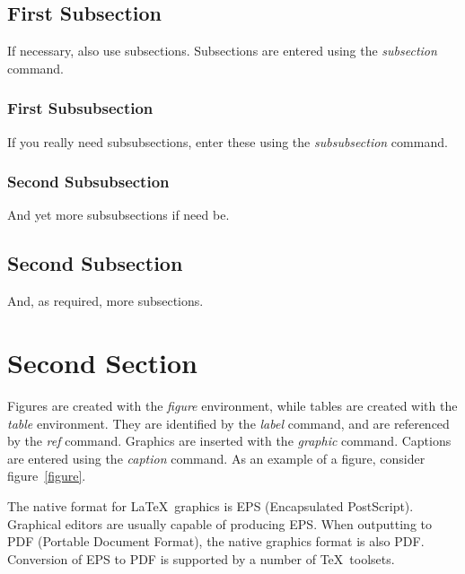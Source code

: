 \documentclass[a4paper,11pt]{report}
\begin{document}
\subsection{First Subsection}

\label{technical-subsection1}

If necessary, also use subsections. Subsections are entered using the
\textit{{\bs}subsection} command.

\subsubsection{First Subsubsection}

\label{technical-subsubsection1}

If you really need subsubsections, enter these using the
\textit{{\bs}subsubsection} command.

\subsubsection{Second Subsubsection}

\label{technical-subsubsection2}

And yet more subsubsections if need be.

\subsection{Second Subsection}

\label{technical-subsection2}

And, as required, more subsections.

\section{Second Section}

\label{technical-section2}

Figures are created with the \textit{figure} environment, while tables are
created with the \textit{table} environment. They are identified by the
\textit{{\bs}label} command, and are referenced by the \textit{{\bs}ref}
command. Graphics are inserted with the \textit{{\bs}graphic} command. Captions
are entered using the \textit{{\bs}caption} command. As an example of a figure,
consider figure~\ref{figure}.

The native format for \LaTeX\ graphics is EPS (Encapsulated PostScript).
Graphical editors are usually capable of producing EPS. When outputting to PDF
(Portable Document Format), the native graphics format is also PDF. Conversion
of EPS to PDF is supported by a number of TeX\ toolsets.
\end{document}
